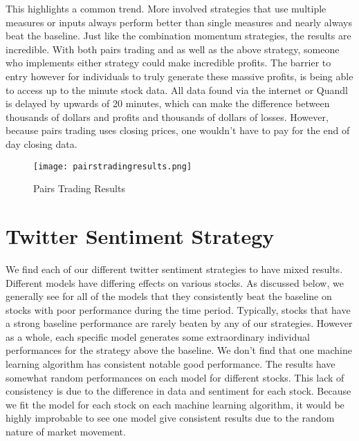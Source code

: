 \documentclass[../thesis.tex]{subfiles}
\begin{document}
This highlights a common trend. More involved strategies that use multiple measures or inputs always perform better than single measures and nearly always beat the baseline. Just like the combination momentum strategies, the results are incredible. With both pairs trading and as well as the above strategy, someone who implements either strategy could make incredible profits. The barrier to entry however for individuals to truly generate these massive profits, is being able to access up to the minute stock data. All data found via the internet or Quandl is delayed by upwards of 20 minutes, which can make the difference between thousands of dollars and profits and thousands of dollars of losses. However, because pairs trading uses closing prices, one wouldn't have to pay for the end of day closing data.

\begin{figure}[h]
\centering
\texttt{[image: pairstradingresults.png]}
\caption{Pairs Trading Results \label{overflow}}
\label{PAIRSRESULTSfigure}
\end{figure}

\section{Twitter Sentiment Strategy}

We find each of our different twitter sentiment strategies to have mixed results. Different models have differing effects on various stocks. As discussed below, we generally see for all of the models that they consistently beat the baseline on stocks with poor performance during the time period. Typically, stocks that have a strong baseline performance are rarely beaten by any of our strategies. However as a whole, each specific model generates some extraordinary individual performances for the strategy above the baseline. We don't find that one machine learning algorithm has consistent notable good performance. The results have somewhat random performances on each model for different stocks. This lack of consistency is due to the difference in data and sentiment for each stock. Because we fit the model for each stock on each machine learning algorithm, it would be highly improbable to see one model give consistent results due to the random nature of market movement. 
\end{document}
